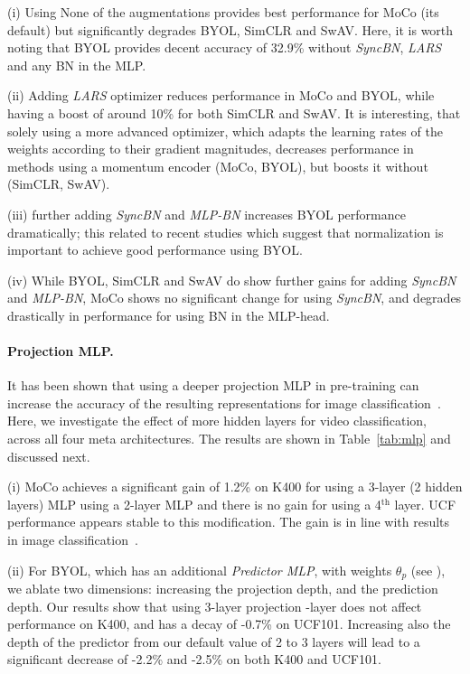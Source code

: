 \documentclass[final]{cvpr}
\newcommand{\tblref}[1]{Table~\ref{#1}}
\begin{document}
(i) Using None of the augmentations provides best performance for MoCo (its default) but significantly degrades BYOL, SimCLR and SwAV. Here, it is worth noting that BYOL provides decent accuracy of 32.9\% without \textit{SyncBN}, \textit{LARS} and any BN in the MLP.

(ii) Adding \textit{LARS} optimizer reduces performance in MoCo and BYOL, while having a boost of around 10\% for both SimCLR and SwAV. It is interesting, that solely using a more advanced optimizer, which adapts the learning rates of the weights according to their gradient magnitudes, decreases performance in methods using a momentum encoder (MoCo, BYOL), but boosts it without (SimCLR, SwAV).

(iii) further adding \textit{SyncBN} and \textit{MLP-BN} increases BYOL performance dramatically; this related to recent studies \cite{richemond2020byol} which suggest that {normalization} is important to achieve good performance using BYOL. 

(iv) While BYOL, SimCLR and SwAV do show further gains for adding \textit{SyncBN} and \textit{MLP-BN}, MoCo shows no significant change for using \textit{SyncBN}, and degrades drastically in performance for using BN in the MLP-head. 

\paragraph{Projection MLP.} It has been shown that using a deeper projection MLP in pre-training can increase the accuracy of the resulting representations for image classification~\cite{Chen20,Chen20moco,chen2020big}. Here, we investigate the effect of more hidden layers for video classification, across all four meta architectures. The results are shown in \tblref{tab:mlp} and discussed next.   

(i) MoCo achieves a significant gain of 1.2\% on K400 for using a 3-layer (2 hidden layers) MLP \vs using a 2-layer MLP and there is no gain for using a 4$^\text{th}$ layer. UCF performance appears stable to this modification. The gain is in line with results in image classification~\cite{Chen20moco}.

(ii) For BYOL, which has an additional \textit{Predictor MLP}, with weights ${\theta_p}$ (see ), we ablate two dimensions: increasing the projection depth, and the prediction depth. Our results show that using 3-layer projection -layer does not affect performance on K400, and has a decay of -0.7\% on UCF101. Increasing also the depth of the predictor from our default value of 2 to 3 layers will lead to a significant decrease of -2.2\% and -2.5\% on both K400 and UCF101. 
\end{document}
